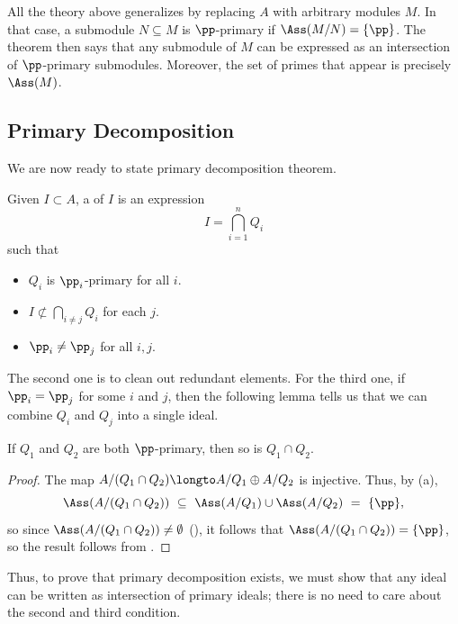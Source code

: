 \begin{remark}
    All the theory above generalizes by replacing
    $A$ with arbitrary modules $M$.
    In that case, a submodule $N\subseteq M$
    is $\pp$-primary if $\Ass(M/N) = \{\pp\}$.
    The theorem then says that any submodule of $M$
    can be expressed as an intersection of $\pp$-primary
    submodules.
    Moreover, the set of primes that appear is precisely
    $\Ass(M)$.
\end{remark}
%
%
%
%
%
\subsection{Primary Decomposition}
We are now ready to state primary decomposition theorem.
\begin{definition}
    Given $I\subset A$, a 
    of $I$ is an expression
    $$I=\bigcap_{i=1}^n Q_i$$
    such that
    \begin{itemize}
    \item $Q_i$ is $\pp_i$-primary for all $i$.
    \item 
    $I\not\subset\bigcap_{i\neq j} Q_i$ for each $j$.
    \item $\pp_i\neq\pp_j$ for all $i,j$.
    \end{itemize}
\end{definition}
The second one is to clean out redundant elements.
For the third one, if $\pp_i=\pp_j$ for some $i$ and $j$,
then the following lemma tells us that 
we can combine $Q_i$ and $Q_j$ into a single ideal.
\begin{lemma}
    If $Q_1$ and $Q_2$ are both $\pp$-primary,
    then so is $Q_1\cap Q_2$.
\end{lemma}
\begin{proof}
    The map $A/(Q_1\cap Q_2) \longto A/Q_1\oplus A/Q_2$
    is injective. Thus, by  (a),
    $$\Ass(A/(Q_1\cap Q_2))\ \subseteq\ \Ass(A/Q_1)
    \cup \Ass(A/Q_2) \ =\ \{\pp\},$$
    so since $\Ass(A/(Q_1\cap Q_2))\neq\emptyset$
    (),
    it follows that $\Ass(A/(Q_1\cap Q_2)) = \{\pp\}$,
    so the result follows from .
\end{proof}
Thus, to prove that primary decomposition exists,
we must show that any ideal can be written as
intersection of primary ideals; there is no need to care
about the second and third condition.

